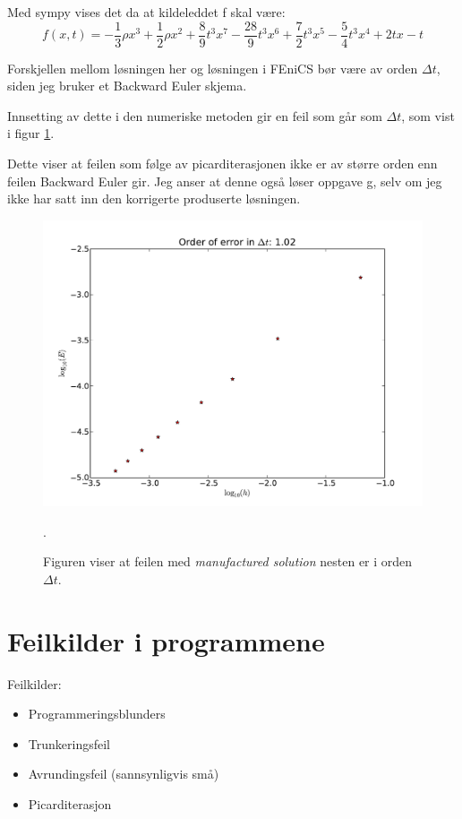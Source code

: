 \documentclass[a4paper, 10pt]{article}
\begin{document}
Med sympy vises det da at kildeleddet f skal være:
\begin{equation}
	f(x, t) = - \frac{1}{3} \rho x^{3} + \frac{1}{2} \rho x^{2} + \frac{8}{9} t^{3} x^{7} - \frac{28}{9} t^{3} x^{6} + \frac{7}{2} t^{3} x^{5} - \frac{5}{4} t^{3} x^{4} + 2 t x - t
\end{equation}

Forskjellen mellom løsningen her og løsningen i FEniCS bør være av orden $\Delta t$, siden jeg bruker et Backward Euler skjema. 

Innsetting av dette i den numeriske metoden gir en feil som går som $\Delta t$, som vist i figur \ref{fig:convergence_manufactured_1d}.

Dette viser at feilen som følge av picarditerasjonen ikke er av større orden enn feilen Backward Euler gir. Jeg anser at denne også løser oppgave g, selv om jeg ikke har satt inn den korrigerte produserte løsningen. 

\begin{figure}[h!tb]
\includegraphics[width=\textwidth]{figures/convergence_manufactured_1d.pdf}
\caption{Figuren viser at feilen med \emph{manufactured solution} nesten er i orden $\Delta t$.}
\label{fig:convergence_manufactured_1d}.
\end{figure}

\section{Feilkilder i programmene}
Feilkilder:
\begin{itemize}
\item Programmeringsblunders
\item Trunkeringsfeil
\item Avrundingsfeil (sannsynligvis små)
\item Picarditerasjon
\end{itemize}
\end{document}
